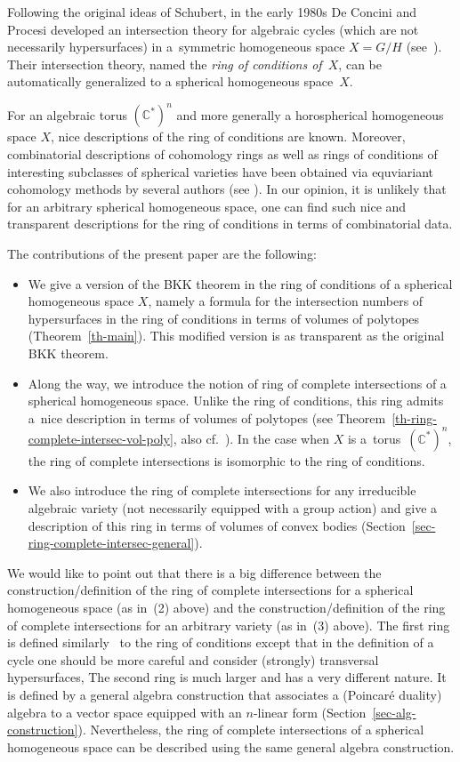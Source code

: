 \documentclass[pdftex]{sigma}
\def \C{\mathbb{C}}
\numberwithin{equation}{section}
\theoremstyle{definition}
\begin{document}
Following the original ideas of Schubert, in the early 1980s De Concini and Procesi deve\-lo\-ped an intersection theory for algebraic cycles (which are not necessarily hypersurfaces) in a~symmetric homogeneous space $X = G/H$ (see~\cite{DP}). Their intersection theory, named the {\it ring of conditions of~$X$}, can be automatically generalized to a spherical homogeneous space~$X$.

For an algebraic torus $(\C^*)^n$ and more generally a horospherical homogeneous space $X$, nice descriptions of the ring of conditions are known. Moreover, combinatorial descriptions of cohomology rings as well as rings of conditions of interesting subclasses of spherical varieties have been obtained via equviariant cohomology methods by several authors (see \cite{Bifet-DeConcini-Procesi,Littelmann-Procesi, Strickland}). In our opinion, it is unlikely that for an arbitrary spherical homogeneous space, one can find such nice and transparent descriptions for the ring of conditions in terms of combinatorial data.

The contributions of the present paper are the following:
\begin{itemize}\itemsep=0pt
\item[(1)] We give a version of the BKK theorem in the ring of conditions of a spherical homogeneous space $X$, namely a formula for the intersection numbers of hypersurfaces in the ring of conditions in terms of volumes of polytopes (Theorem~\ref{th-main}). This modified version is as transparent as the original BKK theorem.
\item[(2)] Along the way, we introduce the notion of ring of complete intersections of a spherical homogeneous space. Unlike the ring of conditions, this ring admits a~nice description in terms of volumes of polytopes (see Theorem~\ref{th-ring-complete-intersec-vol-poly}, also cf.~\cite{Kaveh-note}). In the case when $X$ is a~torus~$(\C^*)^n$, the ring of complete intersections is isomorphic to the ring of conditions.
\item[(3)] We also introduce the ring of complete intersections for any irreducible algebraic variety (not necessarily equipped with a group action) and give a description of this ring in terms of volumes of convex bodies (Section~\ref{sec-ring-complete-intersec-general}).
\end{itemize}

We would like to point out that there is a big difference between the construction/definition of the ring of complete intersections for a spherical homogeneous space (as in~(2) above) and the construction/definition of the ring of complete intersections for an arbitrary variety (as in~(3) above). The first ring is defined similarly  to the ring of conditions except that in the definition of a cycle one should be more careful and consider (strongly) transversal hypersurfaces, The second ring is much larger and has a very different nature. It is defined by a general algebra construction that associates a (Poincar\'e duality) algebra to a vector space equipped with an $n$-linear form (Section~\ref{sec-alg-construction}). Nevertheless, the ring of complete intersections of a spherical homogeneous space can be described using the same general algebra construction.
\end{document}

